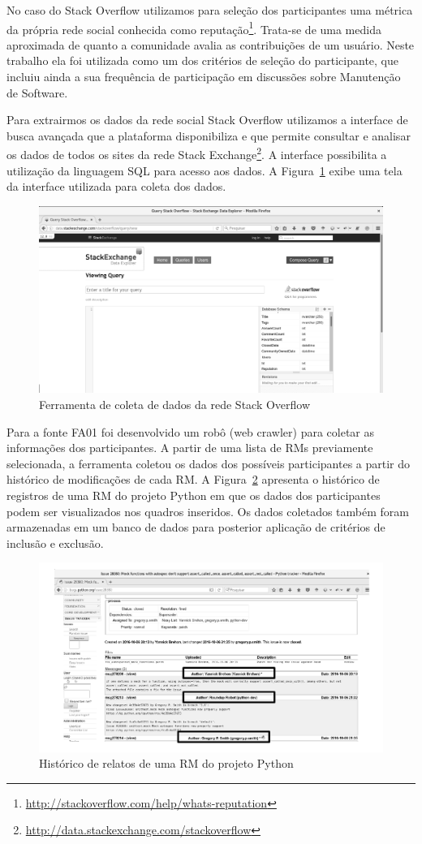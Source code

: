 No caso do Stack Overflow utilizamos para seleção dos participantes uma métrica
da própria rede social conhecida como
reputação\footnote{\url{http://stackoverflow.com/help/whats-reputation}}.
Trata-se de uma medida aproximada de quanto a comunidade avalia as
contribuições de um usuário. Neste trabalho ela foi utilizada como um dos
critérios de seleção do participante, que incluiu ainda a sua frequência de
participação em discussões sobre Manutenção de Software.

Para extrairmos os dados da rede social Stack Overflow utilizamos a interface de
busca avançada que a plataforma disponibiliza e que permite consultar e analisar
os dados de todos os sites da rede Stack
Exchange\footnote{\url{http://data.stackexchange.com/stackoverflow}}. A
interface possibilita a utilização da linguagem SQL para acesso aos dados. A
Figura~\ref{fig:stack-exchange} exibe uma tela da interface utilizada para
coleta dos dados.

\begin{figure}[htpb]
	\centering
	\includegraphics[width=0.7\linewidth]{./chapter-pesquisa-com-profissionais/img/stack-exchange.png}
	\caption{Ferramenta de coleta de dados da rede Stack Overflow}\label{fig:stack-exchange}
\end{figure}

Para a fonte FA01 foi desenvolvido um robô (web crawler) para coletar as
informações dos participantes. A partir de uma lista de RMs previamente
selecionada, a ferramenta coletou os dados dos possíveis participantes a partir
do histórico de modificações de cada RM\@. A
Figura~\ref{fig:historico-rm-python} apresenta o histórico de registros de uma
RM do projeto Python em que os dados dos participantes podem ser visualizados
nos quadros inseridos. Os dados coletados também foram armazenadas em um banco
de dados para posterior aplicação de critérios de inclusão e exclusão.

\begin{figure}[htpb]
	\centering
	\includegraphics[width=0.7\linewidth]{./chapter-pesquisa-com-profissionais/img/historico-rm-python.pdf}
	\caption{Histórico de relatos de uma RM do projeto Python}\label{fig:historico-rm-python}
\end{figure}

